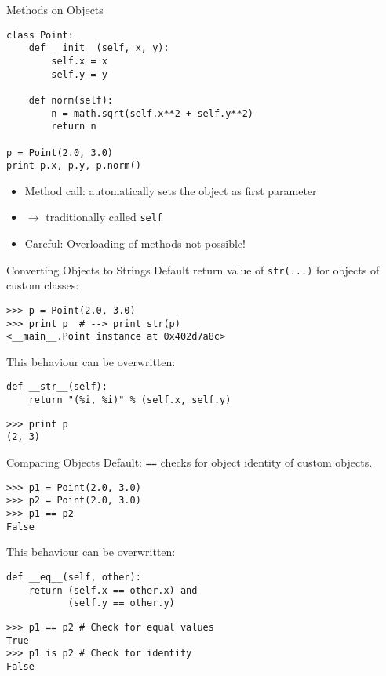\begin{frame}[fragile]{Methods on Objects}
\begin{lstlisting}[style=Python]
class Point:
    def __init__(self, x, y):
        self.x = x
        self.y = y

    def norm(self):
        n = math.sqrt(self.x**2 + self.y**2)
        return n

p = Point(2.0, 3.0)
print p.x, p.y, p.norm()
\end{lstlisting}
\begin{itemize}
\item Method call: automatically sets the object as first parameter
\item $\rightarrow$ traditionally called \lstinline{self}
\item\alert{Careful}: Overloading of methods not possible!
\end{itemize}
\end{frame}

\begin{frame}[fragile]{Converting Objects to Strings}
Default return value of \lstinline{str(...)} for objects of custom classes:
\begin{lstlisting}[style=Shell]
>>> p = Point(2.0, 3.0)
>>> print p  # --> print str(p)
<__main__.Point instance at 0x402d7a8c>
\end{lstlisting}
\vspace{2mm}

This behaviour can be overwritten:
\begin{lstlisting}[style=Python]
def __str__(self):
    return "(%i, %i)" % (self.x, self.y)
\end{lstlisting}
\begin{lstlisting}[style=Shell]
>>> print p
(2, 3)
 \end{lstlisting}
\end{frame}

\begin{frame}[fragile]{Comparing Objects}
Default: \texttt{==} checks for object identity of custom objects.
\begin{lstlisting}[style=Shell]
>>> p1 = Point(2.0, 3.0)
>>> p2 = Point(2.0, 3.0)
>>> p1 == p2
False
\end{lstlisting}
This behaviour can be overwritten:
\begin{lstlisting}[style=Python]
def __eq__(self, other):
    return (self.x == other.x) and
           (self.y == other.y)
\end{lstlisting}
\begin{lstlisting}[style=Shell]
>>> p1 == p2 # Check for equal values
True
>>> p1 is p2 # Check for identity
False
\end{lstlisting}
\end{frame}

